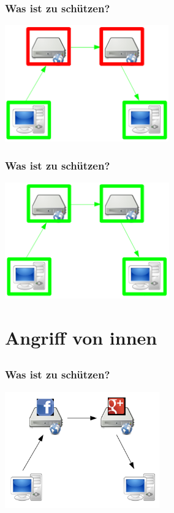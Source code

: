\documentclass[12pt]{beamer}
\begin{document}
\begin{frame}
    \frametitle{Was ist zu schützen?}
    \begin{center}
      \includegraphics[height=5cm]{img/fed-clients-comm.png}
    \end{center}
\end{frame}

\begin{frame}
    \frametitle{Was ist zu schützen?}
    \begin{center}
      \includegraphics[height=5cm]{img/fed-all.png}
    \end{center}
\end{frame}

\section{Angriff von innen}
\subsection{}

\begin{frame}
    \frametitle{Was ist zu schützen?}
    \begin{center}
      \includegraphics[height=5cm]{img/fed-social.png}
    \end{center}
\end{frame}
\end{document}
